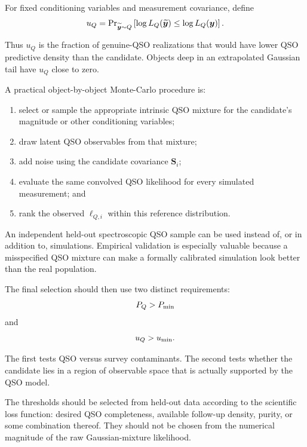 \documentclass[11pt]{article}
\begin{document}
For fixed conditioning variables and measurement covariance, define
%
\begin{equation}
u_Q
=
{\rm Pr}_{\widetilde{\bm{y}}\sim Q}
\left[
\log L_Q(\widetilde{\bm{y}})
\leq
\log L_Q(\bm{y})
\right].
\label{eq:support}
\end{equation}

Thus $u_Q$ is the fraction of genuine-QSO realizations that would have lower
QSO predictive density than the candidate. Objects deep in an extrapolated
Gaussian tail have $u_Q$ close to zero.

A practical object-by-object Monte-Carlo procedure is:

\begin{enumerate}[label=(\arabic*)]
\item select or sample the appropriate intrinsic QSO mixture for the
candidate's magnitude or other conditioning variables;
\item draw latent QSO observables from that mixture;
\item add noise using the candidate covariance $\bm{S}_i$;
\item evaluate the same convolved QSO likelihood for every simulated
measurement; and
\item rank the observed $\ell_{Q,i}$ within this reference distribution.
\end{enumerate}

An independent held-out spectroscopic QSO sample can be used instead of, or
in addition to, simulations. Empirical validation is especially valuable
because a misspecified QSO mixture can make a formally calibrated simulation
look better than the real population.

The final selection should then use two distinct requirements:
%
\begin{equation}
P_Q > P_{\rm min}
\end{equation}
%
and
%
\begin{equation}
u_Q > u_{\rm min}.
\end{equation}

The first tests QSO versus survey contaminants. The second tests whether the
candidate lies in a region of observable space that is actually supported by
the QSO model.

The thresholds should be selected from held-out data according to the
scientific loss function: desired QSO completeness, available follow-up
density, purity, or some combination thereof. They should not be chosen from
the numerical magnitude of the raw Gaussian-mixture likelihood.
\end{document}
